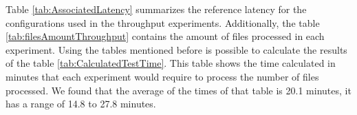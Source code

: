 Table \ref{tab:AssociatedLatency} summarizes the reference latency for the configurations used in the throughput experiments. Additionally, the table \ref{tab:filesAmountThroughput} contains the amount of files processed in each experiment. Using the tables mentioned before is possible to calculate the results of the table \ref{tab:CalculatedTestTime}. This table shows the time calculated in minutes that each experiment would require to process the number of files processed. We found that the average of the times of that table is 20.1 minutes, it has a range of 14.8 to 27.8 minutes. 

\begin{landscape}
\begin{table}[H]
	\centering
	\caption{Associated Latency (Time in milliseconds to process a file)}
	\label{tab:AssociatedLatency}
\end{table}
\end{landscape}
